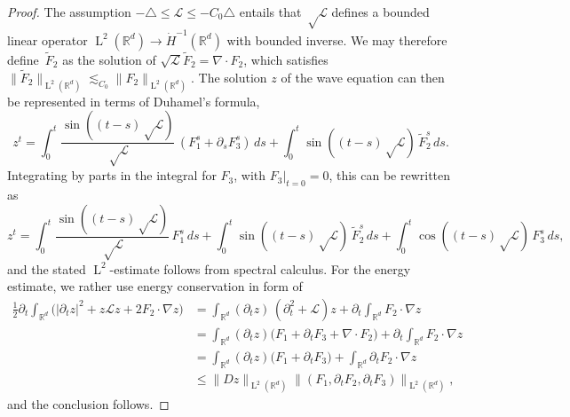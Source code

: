 \documentclass[10pt]{amsart}
\theoremstyle{plain}
\theoremstyle{definition}
\numberwithin{equation}{section}
\newcommand{\Lc}{\mathcal{L}}
\newcommand{\R}{\mathbb R}
\newcommand{\Ld}{\operatorname{L}}
\begin{document}
\begin{proof}
The assumption $-\triangle\le\Lc\le-C_0\triangle$ entails that $\sqrt\Lc$ defines a bounded linear operator $\Ld^2(\R^d)\to\dot H^{-1}(\R^d)$ with bounded inverse. We may therefore define~$\tilde F_2$ as the solution of $\sqrt{\Lc} \tilde F_2=\nabla\cdot F_2$, which satisfies $\|\tilde F_2\|_{\Ld^2(\R^d)}\lesssim_{C_0}\|F_2\|_{\Ld^2(\R^d)}$.
The solution $z$ of the wave equation can then be represented in terms of Duhamel's formula,
\[z^t=\int_0^t\frac{\sin((t-s)\sqrt\Lc)}{\sqrt\Lc}\,(F_1^s+\partial_s F_3^s)\,ds+\int_0^t\sin((t-s)\sqrt\Lc)\,\tilde F_2^s\,ds.\]
Integrating by parts in the integral for $F_3$, with $F_3|_{t=0}=0$, this can be rewritten as
\[z^t=\int_0^t\frac{\sin((t-s)\sqrt\Lc)}{\sqrt\Lc}\,F_1^s\,ds+\int_0^t\sin((t-s)\sqrt\Lc)\,\tilde F_2^s\,ds+\int_0^t\cos((t-s)\sqrt\Lc)\,F_3^s\,ds,\]
and the stated $\Ld^2$-estimate follows from spectral calculus.
For the energy estimate, we rather use energy conservation in form of
\begin{align*}
\tfrac12\partial_t\int_{\R^d}\big(|\partial_tz|^2+z\Lc z+2F_2\cdot\nabla z\big)
&=\int_{\R^d} (\partial_tz)\,(\partial^2_t+\Lc)z+\partial_t\int_{\R^d}F_2\cdot\nabla z\\
&=\int_{\R^d}(\partial_tz)\big(F_1+\partial_tF_3+\nabla\cdot F_2\big)+\partial_t\int_{\R^d}F_2\cdot\nabla z\\
&=\int_{\R^d}(\partial_tz)\big(F_1+\partial_tF_3\big)+\int_{\R^d}\partial_tF_2\cdot\nabla z\\
&\le\|Dz\|_{\Ld^2(\R^d)}\|(F_1,\partial_tF_2,\partial_t F_3)\|_{\Ld^2(\R^d)},
\end{align*}
and the conclusion follows.
\end{proof}
\end{document}
